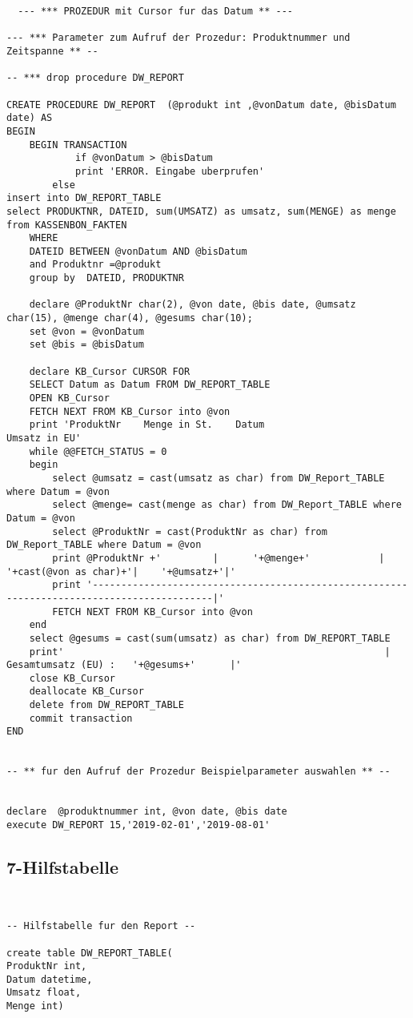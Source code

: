 \begin{lstlisting}
  --- *** PROZEDUR mit Cursor fur das Datum ** ---

--- *** Parameter zum Aufruf der Prozedur: Produktnummer und Zeitspanne ** --

-- *** drop procedure DW_REPORT

CREATE PROCEDURE DW_REPORT  (@produkt int ,@vonDatum date, @bisDatum date) AS
BEGIN
	BEGIN TRANSACTION
			if @vonDatum > @bisDatum
			print 'ERROR. Eingabe uberprufen'
		else
insert into DW_REPORT_TABLE
select PRODUKTNR, DATEID, sum(UMSATZ) as umsatz, sum(MENGE) as menge from KASSENBON_FAKTEN
	WHERE
	DATEID BETWEEN @vonDatum AND @bisDatum
	and Produktnr =@produkt
	group by  DATEID, PRODUKTNR

	declare @ProduktNr char(2), @von date, @bis date, @umsatz char(15), @menge char(4), @gesums char(10);
	set @von = @vonDatum
	set @bis = @bisDatum

	declare KB_Cursor CURSOR FOR
	SELECT Datum as Datum FROM DW_REPORT_TABLE
	OPEN KB_Cursor
	FETCH NEXT FROM KB_Cursor into @von
	print 'ProduktNr    Menge in St.    Datum                     Umsatz in EU'
	while @@FETCH_STATUS = 0
	begin
		select @umsatz = cast(umsatz as char) from DW_Report_TABLE where Datum = @von
		select @menge= cast(menge as char) from DW_Report_TABLE where Datum = @von
		select @ProduktNr = cast(ProduktNr as char) from DW_Report_TABLE where Datum = @von
		print @ProduktNr +'         |      '+@menge+'            |      '+cast(@von as char)+'|    '+@umsatz+'|'
		print '-------------------------------------------------------------------------------------------|'
		FETCH NEXT FROM KB_Cursor into @von
	end
	select @gesums = cast(sum(umsatz) as char) from DW_REPORT_TABLE
	print'                                                        |  Gesamtumsatz (EU) :   '+@gesums+'      |'
	close KB_Cursor
	deallocate KB_Cursor
	delete from DW_REPORT_TABLE
	commit transaction
END


-- ** fur den Aufruf der Prozedur Beispielparameter auswahlen ** --


declare  @produktnummer int, @von date, @bis date
execute DW_REPORT 15,'2019-02-01','2019-08-01'
\end{lstlisting}

\subsection{7-Hilfstabelle}

\begin{lstlisting}


-- Hilfstabelle fur den Report --

create table DW_REPORT_TABLE(
ProduktNr int,
Datum datetime,
Umsatz float,
Menge int)


\end{lstlisting}

\newpage
